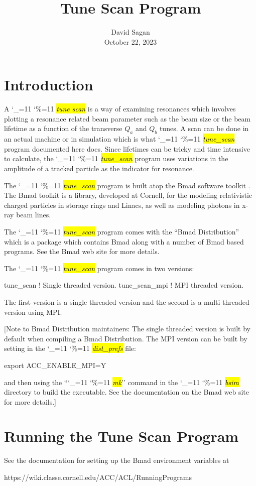 \documentclass{hitec}
\title{Tune Scan Program}
\author{}
\date{David Sagan \\ October 22, 2023}
\newcommand\dottcmd[1]{\hl{\em#1}\endgroup}
\newcommand{\vn}{\begingroup\catcode`\_=11 \catcode`\%=11 \dottcmd}
\newcommand{\ts}{\vn{tune_scan}\xspace}
\newcommand{\Section}[1]{\section{#1}\vspace*{-1ex}}
\begin{document}
\maketitle

\tableofcontents


\Section{Introduction} 
\label{s:intro}

A \vn{tune scan} is a way of examining resonances which involves plotting a resonance related beam
parameter such as the beam size or the beam lifetime as a function of the transverse $Q_a$ and $Q_b$
tunes.  A scan can be done in an actual machine or in simulation which is what \ts program documented here
does. Since lifetimes can be tricky and time intensive to calculate, the \ts program uses variations in the
amplitude of a tracked particle as the indicator for resonance.

The \ts program is built atop the Bmad software toolkit \cite{b:bmad}. The Bmad toolkit is a
library, developed at Cornell, for the modeling relativistic charged particles in storage rings and
Linacs, as well as modeling photons in x-ray beam lines.

The \ts program comes with the ``Bmad Distribution'' which is a package which contains Bmad along with
a number of Bmad based programs. See the Bmad web site for more details.

The \ts program comes in two versions: 
\begin{code}
tune_scan      ! Single threaded version.
tune_scan_mpi  ! MPI threaded version.
\end{code}
The first version is a single threaded version and the second is a multi-threaded version using MPI.

[Note to Bmad Distribution maintainers: The single threaded version is built by default when compiling a Bmad
Distribution. The MPI version can be built by setting in the \vn{dist_prefs} file:
\begin{code}
  export ACC_ENABLE_MPI=Y
\end{code}
and then using the ``\vn{mk}'' command in the \vn{bsim} directory to build the executable. See the
documentation on the Bmad web site for more details.]

\Section{Running the Tune Scan Program} 
\label{s:run}

See the documentation for setting up the Bmad environment variables at
\begin{code}
https://wiki.classe.cornell.edu/ACC/ACL/RunningPrograms
\end{code}
\end{document}
